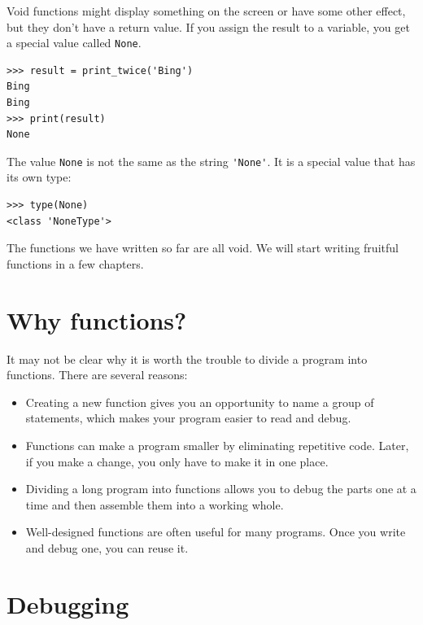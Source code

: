 \documentclass[10pt]{book}
\begin{document}
Void functions might display something on the screen or have some
other effect, but they don't have a return value.  If you
assign the result to a variable, you get a special value called
{\tt None}.

\begin{verbatim}
>>> result = print_twice('Bing')
Bing
Bing
>>> print(result)
None
\end{verbatim}
%
The value {\tt None} is not the same as the string \verb"'None'". 
It is a special value that has its own type:

\begin{verbatim}
>>> type(None)
<class 'NoneType'>
\end{verbatim}
%
The functions we have written so far are all void.  We will start
writing fruitful functions in a few chapters.


\section{Why functions?}

It may not be clear why it is worth the trouble to divide
a program into functions.  There are several reasons:

\begin{itemize}

\item Creating a new function gives you an opportunity to name a group
of statements, which makes your program easier to read and debug.

\item Functions can make a program smaller by eliminating repetitive
code.  Later, if you make a change, you only have
to make it in one place.

\item Dividing a long program into functions allows you to debug the
parts one at a time and then assemble them into a working whole.

\item Well-designed functions are often useful for many programs.
Once you write and debug one, you can reuse it.

\end{itemize}


\section{Debugging}
\end{document}
